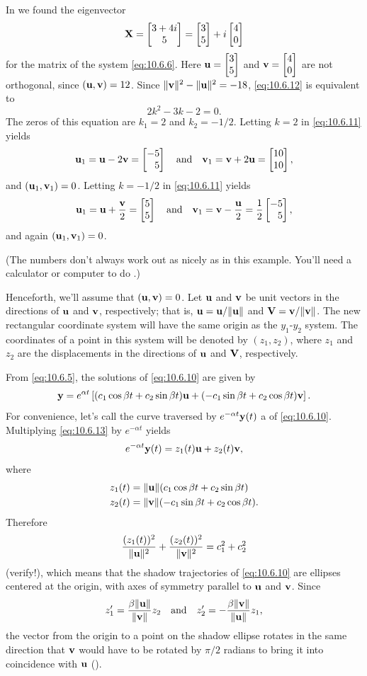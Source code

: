 \begin{example}\label{example:10.6.5}
In 
we found the eigenvector
\[
\mathbf{X}=\begin{bmatrix}3+4i\\5\end{bmatrix}=\begin{bmatrix}3\\5\end{bmatrix}+i\begin{bmatrix}4\\0\end{bmatrix}
\]
for the matrix of the system \eqref{eq:10.6.6}. Here $\mathbf{u}=\begin{bmatrix}3\\5\end{bmatrix}$
and $\mathbf{v}=\begin{bmatrix}4\\0\end{bmatrix}$ are not orthogonal, since $(\mathbf{u},\mathbf{v})=12$. Since $\|\mathbf{v}\|^2-\|\mathbf{u}\|^2=-18$, \eqref{eq:10.6.12} is
equivalent to
\[
2k^2-3k-2=0.
\]
The zeros of this equation are $k_1=2$ and $k_2=-1/2$. Letting $k=2$
in \eqref{eq:10.6.11} yields
\[
\mathbf{u}_1=\mathbf{u}-2\mathbf{v}=\begin{bmatrix}-5\\\phantom{-}5\end{bmatrix}\quad\text{and}\quad 
\mathbf{v}_1=\mathbf{v}+2\mathbf{u}=\begin{bmatrix}10\\10\end{bmatrix},
\]
and $(\mathbf{u}_1,\mathbf{v}_1)=0$.
 Letting $k=-1/2$
in \eqref{eq:10.6.11} yields
\[
\mathbf{u}_1=\mathbf{u}+\frac{\mathbf{v}}{2}=\begin{bmatrix}5\\5\end{bmatrix}\quad\text{and}\quad 
\mathbf{v}_1=\mathbf{v}-\frac{\mathbf{u}}{2}=\frac{1}{2}\begin{bmatrix}-5\\\phantom{-}5\end{bmatrix},
\]
and again $(\mathbf{u}_1,\mathbf{v}_1)=0$.
\end{example}

(The numbers don't always work out as nicely as in this example.
You'll need a calculator or computer to do
.)

Henceforth, we'll assume that $(\mathbf{u},\mathbf{v})=0$. Let $\mathbf{u}$ and
$\mathbf{v}$ be unit vectors in the directions of $\mathbf{u}$ and $\mathbf{v}$, respectively; that is, $\mathbf{u}=\mathbf{u}/\|\mathbf{u}\|$ and $\mathbf{V}=\mathbf{v}/\|\mathbf{v}\|$. The new rectangular coordinate system will
have the same origin as the $y_1$-$y_2$ system. The coordinates of a
point in this system will be denoted by $(z_1,z_2)$, where $z_1$ and
$z_2$ are the displacements in the directions of $\mathbf{u}$ and $\mathbf{V}$, respectively.

From \eqref{eq:10.6.5}, the solutions of \eqref{eq:10.6.10} are given by
\begin{equation} \label{eq:10.6.13} \mathbf{y}=e^{\alpha t}\left[(c_1\cos\beta
t+c_2\sin\beta t)\mathbf{u} +(-c_1\sin\beta t+c_2\cos\beta t)\mathbf{v}\right]. \end{equation} For convenience, let's call the curve
traversed by $e^{-\alpha t}\mathbf{y}(t)$ a  of
\eqref{eq:10.6.10}. Multiplying \eqref{eq:10.6.13} by $e^{-\alpha t}$ yields
\[
e^{-\alpha t}\mathbf{y}(t)=z_1(t)\mathbf{u}+z_2(t)\mathbf{v},
\]
where
\begin{align*}
z_1(t)&=\|\mathbf{u}\|(c_1\cos\beta t+c_2\sin\beta t)\\
z_2(t)&=\|\mathbf{v}\|(-c_1\sin\beta t+c_2\cos\beta t).
\end{align*}
Therefore
\[ \frac{(z_1(t))^2}{\|\mathbf{u}\|^2}+\frac{(z_2(t))^2}{\|\mathbf{v}\|^2} =c_1^2+c_2^2
\]
(verify!), which means that the shadow trajectories of \eqref{eq:10.6.10}
are ellipses centered at the origin, with axes of symmetry parallel to
$\mathbf{u}$ and $\mathbf{v}$. Since
\[
z_1'=\frac{\beta\|\mathbf{u}\|}{\|\mathbf{v}\|} z_2\quad\text{and}\quad 
z_2'=-\frac{\beta\|\mathbf{v}\|}{\|\mathbf{u}\|} z_1,
\]
 the vector from the
origin to a point on the shadow ellipse rotates in the same direction
that $\mathbf{v}$ would have to be rotated by $\pi/2$ radians to bring it
into coincidence with $\mathbf{u}$ ().

